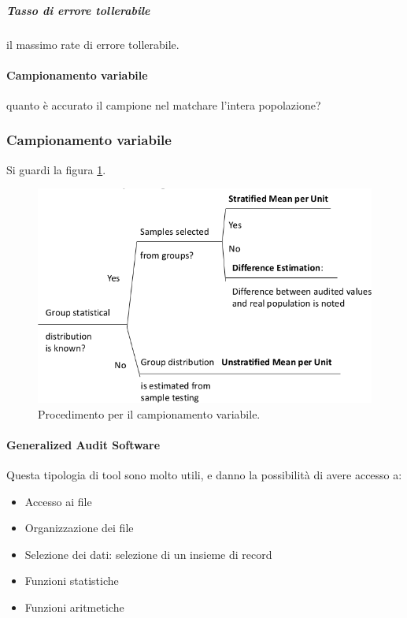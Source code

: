 \subparagraph*{Tasso di errore tollerabile} il massimo rate di errore tollerabile.

\paragraph*{Campionamento variabile} quanto è accurato il campione nel matchare l'intera popolazione? 


\subsubsection{Campionamento variabile}
Si guardi la figura \ref{fig:variable:sampling}.
\begin{figure}[h!]
	\begin{center}
		\includegraphics[scale=0.45]{res/img/variable_sampling.png}
	\end{center}
	\caption{Procedimento per il campionamento variabile.}
	\label{fig:variable:sampling}
\end{figure}



\paragraph{Generalized Audit Software}

Questa tipologia di tool sono molto utili, e danno la possibilità di avere accesso a:
\begin{itemize}
\item Accesso ai file
\item Organizzazione dei file
\item Selezione dei dati: selezione di un insieme di record
\item Funzioni statistiche
\item Funzioni aritmetiche
\end{itemize}

